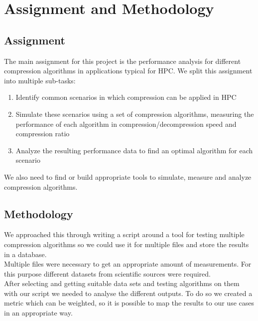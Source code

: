 \documentclass[
	12pt,
	a4paper,
	BCOR10mm,
	DIV14,
	listof=totoc,
	bibliography=totoc,
	headsepline
]{scrreprt}
\begin{document}
\chapter{Assignment and Methodology}
\label{Assignment and Methodology}
\section*{Assignment}
The main assignment for this project is the performance analysis for different compression algorithms in applications typical for HPC. We split this assignment into multiple sub-tasks:

\begin{enumerate}
\item Identify common scenarios in which compression can be applied in HPC
\item Simulate these scenarios using a set of compression algorithms, measuring the performance of each algorithm in compression/decompression speed and compression ratio
\item Analyze the resulting performance data to find an optimal algorithm for each scenario
\end{enumerate}

We also need to find or build appropriate tools to simulate, measure and analyze compression algorithms.


\section*{Methodology}
We approached this through writing a script around a tool for testing multiple compression algorithms so we could use it for multiple files and store the results in a database. 
\\
Multiple files were necessary to get an appropriate amount of measurements.
For this purpose different datasets from scientific sources were required.
\\
After selecting and getting suitable data sets and testing algorithms on them with our script we needed to analyse the different outputs.
To do so we created a metric which can be weighted, so it is possible to map the results to our use cases in an appropriate way. \\
\end{document}

